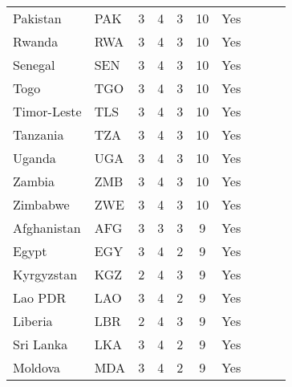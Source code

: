 \begin{singlespace}
{\begin{longtable}{l l c c c c c c c c}
Pakistan                   & PAK           & 3          & 4                   & 3         & 10                & Yes             \\
Rwanda                     & RWA           & 3          & 4                   & 3         & 10                & Yes             \\
Senegal                    & SEN           & 3          & 4                   & 3         & 10                & Yes             \\
Togo                       & TGO           & 3          & 4                   & 3         & 10                & Yes             \\
Timor-Leste                & TLS           & 3          & 4                   & 3         & 10                & Yes             \\
Tanzania                   & TZA           & 3          & 4                   & 3         & 10                & Yes             \\
Uganda                     & UGA           & 3          & 4                   & 3         & 10                & Yes             \\
Zambia                     & ZMB           & 3          & 4                   & 3         & 10                & Yes             \\
Zimbabwe                   & ZWE           & 3          & 4                   & 3         & 10                & Yes             \\
Afghanistan                & AFG           & 3          & 3                   & 3         & 9                 & Yes             \\
Egypt                      & EGY           & 3          & 4                   & 2         & 9                 & Yes             \\
Kyrgyzstan                 & KGZ           & 2          & 4                   & 3         & 9                 & Yes             \\
Lao PDR                    & LAO           & 3          & 4                   & 2         & 9                 & Yes             \\
Liberia                    & LBR           & 2          & 4                   & 3         & 9                 & Yes             \\
Sri Lanka                  & LKA           & 3          & 4                   & 2         & 9                 & Yes             \\
Moldova                    & MDA           & 3          & 4                   & 2         & 9                 & Yes             \\

\end{longtable}}
\end{singlespace}
